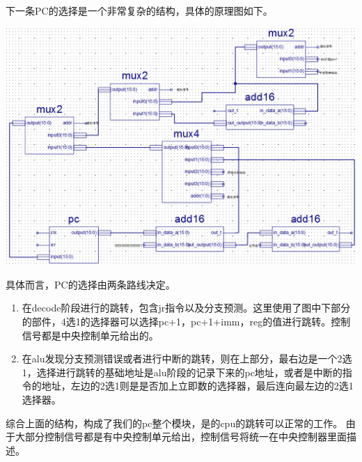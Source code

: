 下一条PC的选择是一个非常复杂的结构，具体的原理图如下。
\begin{center}
    \includegraphics[width=14cm]{image/detail/detail_pc_structure.png}
    \label{fig:pcstructure}
\end{center}
具体而言，PC的选择由两条路线决定。
\begin{enumerate}
    \item 在decode阶段进行的跳转，包含jr指令以及分支预测。这里使用了图中下部分的部件，4选1的选择器可以选择pc+1，pc+1+imm，reg的值进行跳转。控制信号都是中央控制单元给出的。
    \item 在alu发现分支预测错误或者进行中断的跳转，则在上部分，最右边是一个2选1，选择进行跳转的基础地址是alu阶段的记录下来的pc地址，或者是中断的指令的地址，左边的2选1则是是否加上立即数的选择器，最后连向最左边的2选1选择器。
\end{enumerate}
综合上面的结构，构成了我们的pc整个模块，是的cpu的跳转可以正常的工作。
由于大部分控制信号都是有中央控制单元给出，控制信号将统一在中央控制器里面描述。

